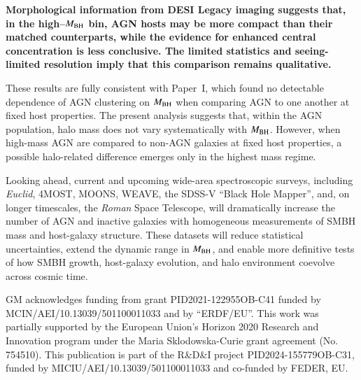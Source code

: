 \documentclass{aa}
\begin{document}
\textbf{Morphological information from DESI Legacy imaging suggests that, in the
high–$M_{\rm BH}$ bin, AGN hosts may be more compact than their matched
counterparts, while the evidence for enhanced central concentration is less
conclusive. The limited statistics and seeing-limited resolution imply that
this comparison remains qualitative.}

These results are fully consistent with Paper~I, which found no detectable
dependence of AGN clustering on $M_{\rm BH}$ when comparing AGN to one another
at fixed host properties. The present analysis suggests that, within the AGN population, halo mass does not
vary systematically with $M_{\rm BH}$. However, when high-mass AGN are compared
to non-AGN galaxies at fixed host properties, a possible halo-related
difference emerges only in the highest mass regime.

Looking ahead, current and upcoming wide-area spectroscopic surveys, including
\textit{Euclid}, 4MOST, MOONS, WEAVE, the SDSS-V ``Black Hole Mapper'', and,
on longer timescales, the \textit{Roman} Space Telescope, will dramatically
increase the number of AGN and inactive galaxies with homogeneous measurements
of SMBH mass and host-galaxy structure. These datasets will reduce statistical
uncertainties, extend the dynamic range in $M_{\rm BH}$, and enable more
definitive tests of how SMBH growth, host-galaxy evolution, and halo
environment coevolve across cosmic time.




\begin{acknowledgements}
GM acknowledges funding from grant PID2021-122955OB-C41 funded by MCIN/AEI/10.13039/501100011033 and by “ERDF/EU”. This work was partially supported by the European Union's Horizon 2020 Research and Innovation program under the Maria Sklodowska-Curie grant agreement (No. 754510). This publication is part of the R\&D\&I project PID2024-155779OB-C31, funded by MICIU/AEI/10.13039/501100011033 and co-funded by FEDER, EU.




\end{acknowledgements}



\end{document}
